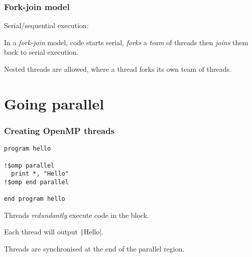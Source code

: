 \documentclass{beamer}
\begin{document}
\begin{frame}
\frametitle{Fork-join model}
Serial/sequential execution:
\begin{center}
\end{center}

In a \emph{fork-join} model, code starts serial, \emph{forks} a \emph{team} of threads then \emph{joins} them back to serial execution.
\begin{center}
\end{center}

Nested threads are allowed, where a thread forks its own team of threads.
\end{frame}

\section{Going parallel}
\begin{frame}[fragile]
\frametitle{Creating OpenMP threads}
\begin{verbatim}
program hello

!$omp parallel
  print *, "Hello"
!$omp end parallel

end program hello
\end{verbatim}

Threads \emph{redundantly} execute code in the block.

Each thread will output \texttt|Hello|.

Threads are synchronised at the end of the parallel region.

\end{frame}
\end{document}
